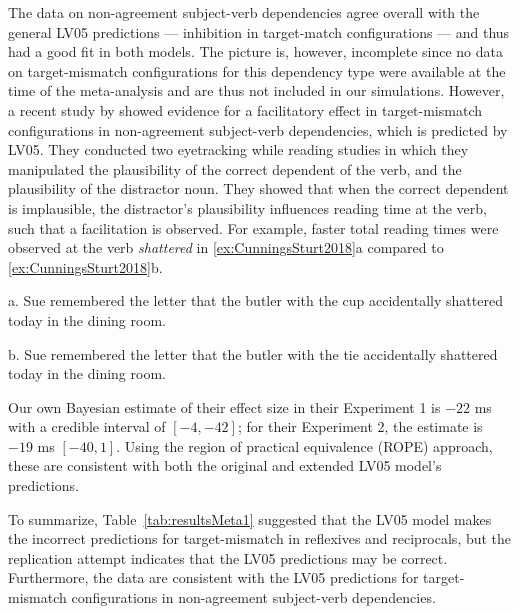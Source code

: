 \documentclass{cambridge7A}\usepackage[]{graphicx}\usepackage[]{color}
\begin{document}
The data on non-agreement subject-verb dependencies agree overall with the general LV05 predictions --- inhibition in target-match configurations --- and thus had a good fit in both models. The picture is, however, incomplete since no data on target-mismatch configurations for this dependency type were available at the time of the \cite{JaegerEngelmannVasishth2017} meta-analysis and are thus not included in our simulations.
However, a recent study by \cite{CunningsSturt2018} showed evidence for a facilitatory effect in target-mismatch configurations in non-agreement subject-verb dependencies, which is predicted by LV05. 
They conducted two eyetracking while reading studies in which they manipulated the plausibility of the correct dependent of the verb, and the plausibility of the distractor noun. They showed that when the correct dependent is implausible, the distractor's plausibility influences reading time at the verb, such that a facilitation is observed. 
For example, faster total reading times were observed at the verb \textit{shattered} in \ref{ex:CunningsSturt2018}a compared to \ref{ex:CunningsSturt2018}b. 

\begin{exe}
\ex\label{ex:CunningsSturt2018}
\begin{xlist}
\item[a.] Sue remembered the letter that the butler with the cup accidentally shattered today in the dining room. 
\item[b.] Sue remembered the letter that the butler with the tie accidentally shattered today in the dining room. 
\end{xlist}
\end{exe}

Our own Bayesian estimate of their effect size in their Experiment 1 is $-22$ ms with a credible interval of $[-4,-42]$; for their Experiment 2, the estimate is $-19$ ms $[-40,1]$. Using the   region of practical equivalence (ROPE) approach, these are consistent with both the original and extended LV05 model's predictions.

To summarize, Table~\ref{tab:resultsMeta1} suggested that the LV05 model makes the incorrect predictions for target-mismatch in reflexives and reciprocals, but the \cite{JaegerMertzenVanDykeVasishth2019} replication attempt indicates that the LV05 predictions may be correct. Furthermore, the \cite{CunningsSturt2018} data are consistent with the LV05 predictions for target-mismatch configurations in non-agreement subject-verb dependencies.
\end{document}
